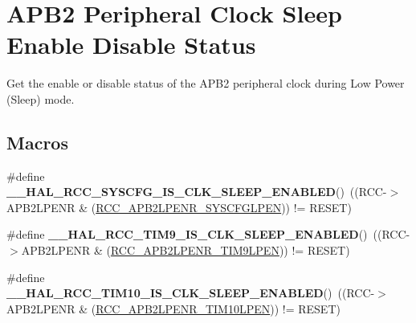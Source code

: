 \hypertarget{group___r_c_c___a_p_b2___clock___sleep___enable___disable___status}{\section{A\-P\-B2 Peripheral Clock Sleep Enable Disable Status}
\label{group___r_c_c___a_p_b2___clock___sleep___enable___disable___status}
}


Get the enable or disable status of the A\-P\-B2 peripheral clock during Low Power (Sleep) mode.  


\subsection*{Macros}
\begin{DoxyCompactItemize}
\item 
\hypertarget{group___r_c_c___a_p_b2___clock___sleep___enable___disable___status_ga0e518b9a088d789d700d121db458403a}{\#define {\bfseries \-\_\-\-\_\-\-H\-A\-L\-\_\-\-R\-C\-C\-\_\-\-S\-Y\-S\-C\-F\-G\-\_\-\-I\-S\-\_\-\-C\-L\-K\-\_\-\-S\-L\-E\-E\-P\-\_\-\-E\-N\-A\-B\-L\-E\-D}()~((R\-C\-C-\/$>$A\-P\-B2\-L\-P\-E\-N\-R \& (\hyperlink{group___peripheral___registers___bits___definition_gaaa82cfc33f0cf71220398bbe1c4b412e}{R\-C\-C\-\_\-\-A\-P\-B2\-L\-P\-E\-N\-R\-\_\-\-S\-Y\-S\-C\-F\-G\-L\-P\-E\-N})) != R\-E\-S\-E\-T)}\label{group___r_c_c___a_p_b2___clock___sleep___enable___disable___status_ga0e518b9a088d789d700d121db458403a}

\item 
\hypertarget{group___r_c_c___a_p_b2___clock___sleep___enable___disable___status_ga255709a840c9a7e6f894df4f40ee6e64}{\#define {\bfseries \-\_\-\-\_\-\-H\-A\-L\-\_\-\-R\-C\-C\-\_\-\-T\-I\-M9\-\_\-\-I\-S\-\_\-\-C\-L\-K\-\_\-\-S\-L\-E\-E\-P\-\_\-\-E\-N\-A\-B\-L\-E\-D}()~((R\-C\-C-\/$>$A\-P\-B2\-L\-P\-E\-N\-R \& (\hyperlink{group___peripheral___registers___bits___definition_ga91b882f3dc2b939a53ed3f4caa537de1}{R\-C\-C\-\_\-\-A\-P\-B2\-L\-P\-E\-N\-R\-\_\-\-T\-I\-M9\-L\-P\-E\-N})) != R\-E\-S\-E\-T)}\label{group___r_c_c___a_p_b2___clock___sleep___enable___disable___status_ga255709a840c9a7e6f894df4f40ee6e64}

\item 
\hypertarget{group___r_c_c___a_p_b2___clock___sleep___enable___disable___status_ga420cca0cf8e74d769361540b398154ea}{\#define {\bfseries \-\_\-\-\_\-\-H\-A\-L\-\_\-\-R\-C\-C\-\_\-\-T\-I\-M10\-\_\-\-I\-S\-\_\-\-C\-L\-K\-\_\-\-S\-L\-E\-E\-P\-\_\-\-E\-N\-A\-B\-L\-E\-D}()~((R\-C\-C-\/$>$A\-P\-B2\-L\-P\-E\-N\-R \& (\hyperlink{group___peripheral___registers___bits___definition_gae7999e2ebeb1300d0cf6a59ad92c41b6}{R\-C\-C\-\_\-\-A\-P\-B2\-L\-P\-E\-N\-R\-\_\-\-T\-I\-M10\-L\-P\-E\-N})) != R\-E\-S\-E\-T)}\label{group___r_c_c___a_p_b2___clock___sleep___enable___disable___status_ga420cca0cf8e74d769361540b398154ea}


\end{DoxyCompactItemize}
